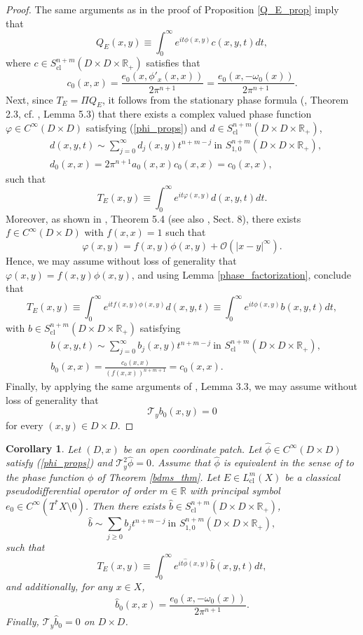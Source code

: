 \documentclass{article}
\newtheorem{corollary}[theorem]{Corollary}
\newcommand{\RR}{\mathbb R}
\newcommand{\mct}{\mathcal T}
\newcommand{\mco}{\mathcal O}
\DeclareMathOperator{\cl}{cl}
\begin{document}
\begin{proof}
The same arguments as in the proof of Proposition \ref{Q_E_prop} imply that $$Q_E(x,y) \equiv \int_0^\infty e^{it \phi(x,y)} c(x,y,t) dt,$$
where $c \in S^{n+m}_{\cl}(D \times D \times \RR_+)$ satisfies that $$c_0(x,x)= \frac{e_0(x, \phi'_x(x,x))}{2\pi^{n+1}} = \frac{e_0(x, -\omega_0(x))}{2\pi^{n+1}}.$$
Next, since $T_E = \Pi Q_E$, it follows from the stationary phase formula (\cite{ms}, Theorem 2.3, cf. \cite{hsiaomari2}, Lemma 5.3) that there exists a complex valued phase function $\varphi \in C^\infty(D \times D)$ satisfying (\ref{phi_props}) and $d \in S^{n+m}_{\cl}(D \times D \times \RR_+)$, $$ \begin{aligned} &d(x,y,t) \sim \sum_{j = 0}^\infty d_j(x,y) t^{n+m-j}\ \text{in } S^{n+m}_{1,0}(D \times D \times \RR_+),\\ & d_0(x,x) = 2 \pi^{n+1} a_0(x,x) c_0(x,x) = c_0(x,x), \end{aligned}$$such that $$T_E(x,y) \equiv \int_0^\infty e^{it \varphi(x,y)} d(x,y,t) dt.$$
Moreover, as shown in \cite{hsiaomari2}, Theorem 5.4 (see also \cite{hsiaomari2}, Sect. 8), there exists $f \in C^\infty(D \times D)$ with $f(x,x) = 1$ such that $$\varphi(x,y) = f(x,y) \phi(x,y) + \mco(|x-y|^\infty).$$
Hence, we may assume without loss of generality that $\varphi(x,y) = f(x,y) \phi(x,y)$, and using Lemma \ref{phase_factorization}, conclude that $$T_E(x,y) \equiv \int_0^\infty e^{it f(x,y) \phi(x,y)} d(x,y,t) \equiv \int_0^\infty e^{it \phi(x,y)} b(x,y,t) dt,$$
with $b \in S^{n+m}_{\cl}(D \times D \times \RR_+)$ satisfying $$\begin{aligned} &b(x,y,t) \sim \sum_{j = 0}^\infty b_j(x,y) t^{n+m-j}\ \text{in } S^{n+m}_{\cl}(D \times D \times \RR_+),\\ &b_0(x,x) = \frac{c_0(x,x)}{(f(x,x))^{n+m+1}} = c_0(x,x).\end{aligned}$$
Finally, by applying the same arguments of \cite{hsiao_shen}, Lemma 3.3, we may assume without loss of generality that $$\mct_y b_0(x,y) = 0$$ for every $(x,y) \in D \times D$.
%
%
%
% 
\end{proof}
%
\begin{corollary} Let $(D, x)$ be an open coordinate patch. Let $\hat \phi \in C^\infty(D \times D)$ satisfy (\ref{phi_props}) and $\mct_y^2 \hat \phi = 0$. Assume that $\hat \phi$ is equivalent in the sense of \cite{ms} to the phase function $\phi$ of Theorem \ref{bdms_thm}. Let $E\in L^m_{\cl}(X)$ be a classical pseudodifferential operator of order $m \in \mathbb R$ with principal symbol $e_0 \in C^\infty(T^*X \setminus 0)$. Then there exists $\hat b \in S^{n+m}_{\cl}(D \times D \times \RR_+)$,
%
$$\hat b \sim \sum_{j \ge 0} b_j t^{n+m-j} \ \text{in } S^{n+m}_{1,0}(D \times D \times \RR_+),$$
%
such that $$T_E(x,y) \equiv \int_0^\infty e^{it \hat \phi(x,y)} \hat b(x,y,t) dt,$$
and additionally, for any $x \in X$, $$\hat b_0(x,x) = \frac{e_0(x, -\omega_0(x))}{2\pi^{n+1}}.$$
Finally, $\mct_y \hat b_0 = 0$ on $D \times D$. \end{corollary}
\end{document}
